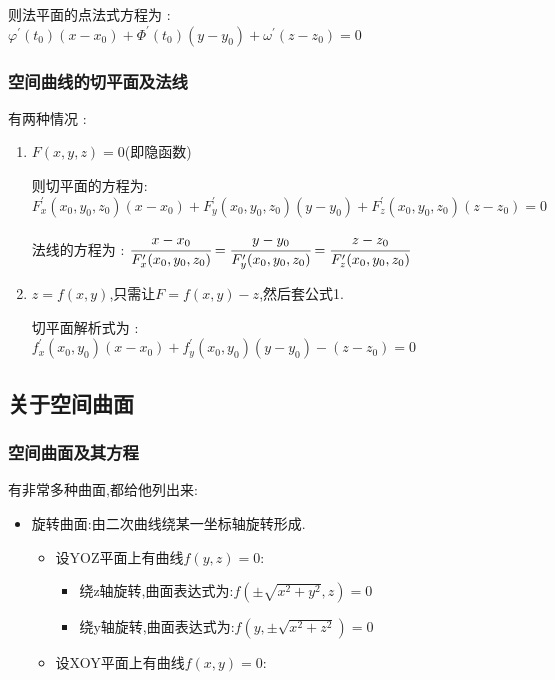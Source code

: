 \documentclass[UTF8,12pt]{ctexbook}
\newcommand{\derivative}{^\prime}
\newcommand{\defFunction}[1]{f(#1)}
\begin{document}
{{{{      则法平面的点法式方程为 : $\varphi\derivative(t_0)(x - x_0) + \Phi\derivative(t_0)(y - y_0) + \omega\derivative(z - z_0) = 0$
    }%

    \subsubsection{空间曲线的切平面及法线}{
      有两种情况 :

      \begin{enumerate}
        \item {
              $F(x,y,z) = 0$(即隐函数)

              则切平面的方程为:$F\derivative_x(x_0,y_0,z_0)(x - x_0) + F\derivative_y(x_0,y_0,z_0)(y - y_0) + F\derivative_z(x_0,y_0,z_0)(z - z_0) = 0$

              法线的方程为 : $\cfrac{x - x_0}{F\derivative_x(x_0,y_0,z_0)} = \cfrac{y - y_0}{F\derivative_y(x_0,y_0,z_0)} = \cfrac{z - z_0}{F\derivative_z(x_0,y_0,z_0)}$
              }
        \item {
              $z = \defFunction{x,y}$,只需让$F = \defFunction{x,y} - z$,然后套公式1.

              切平面解析式为 : $f\derivative_x(x_0,y_0)(x - x_0) + f\derivative_y(x_0,y_0)(y - y_0) - (z - z_0) = 0$
              }
      \end{enumerate}
    }%

  }%

  \subsection{关于空间曲面}{

    \subsubsection{空间曲面及其方程}{
      有非常多种曲面,都给他列出来:

      \begin{itemize}
        \item {
              旋转曲面:由二次曲线绕某一坐标轴旋转形成.

              \begin{itemize}
                \item {
                      设YOZ平面上有曲线$\defFunction{y,z} = 0$:

                      \begin{itemize}
                        \item 绕z轴旋转,曲面表达式为:$\defFunction{\pm\sqrt{x^2 + y^2},z} = 0$
                        \item 绕y轴旋转,曲面表达式为:$\defFunction{y,\pm\sqrt{x^2 + z^2}} = 0$
                      \end{itemize}
                      }
                \item {
                      设XOY平面上有曲线$\defFunction{x,y} = 0$:

}
\end{itemize}}
\end{itemize}}}}}
\end{document}
